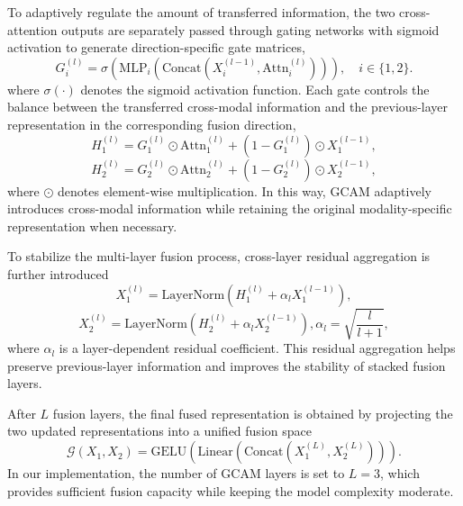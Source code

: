 \documentclass[a4paper,fleqn]{cas-dc}
\begin{document}
To adaptively regulate the amount of transferred information, the two cross-attention outputs are separately passed through gating networks with sigmoid activation to generate direction-specific gate matrices,
\begin{equation}
    G_i^{(l)}=\sigma\left(
\mathrm{MLP}_i\left(
\mathrm{Concat}\left(X_i^{(l-1)}, \mathrm{Attn}_i^{(l)}\right)
\right)
\right), \quad i\in\{1,2\}.
\end{equation}
where $\sigma(\cdot)$ denotes the sigmoid activation function. Each gate controls the balance between the transferred cross-modal information and the previous-layer representation in the corresponding fusion direction,
\begin{equation}
H_1^{(l)}
=
G_1^{(l)} \odot \mathrm{Attn}_1^{(l)}
+
\left(1-G_1^{(l)}\right)\odot X_1^{(l-1)},
\end{equation}
\vspace{-2em}
\begin{equation}
H_2^{(l)}
=
G_2^{(l)} \odot \mathrm{Attn}_2^{(l)}
+
\left(1-G_2^{(l)}\right)\odot X_2^{(l-1)},
\end{equation}
where $\odot$ denotes element-wise multiplication. In this way, GCAM adaptively introduces cross-modal information while retaining the original modality-specific representation when necessary.

To stabilize the multi-layer fusion process, cross-layer residual aggregation is further introduced
\begin{equation}
X_1^{(l)}
=
\mathrm{LayerNorm}
\left(
H_1^{(l)}+\alpha_l X_1^{(l-1)}
\right),
\end{equation}
\vspace{-2em}
\begin{equation}
X_2^{(l)}
=
\mathrm{LayerNorm}
\left(
H_2^{(l)}+\alpha_l X_2^{(l-1)}
\right),
\alpha_l=\sqrt{\frac{l}{l+1}},
\end{equation}
where $\alpha_l$ is a layer-dependent residual coefficient. This residual aggregation helps preserve previous-layer information and improves the stability of stacked fusion layers.

After $L$ fusion layers, the final fused representation is obtained by projecting the two updated representations into a unified fusion space
\begin{equation}
\mathcal{G}(X_1,X_2)
=
\mathrm{GELU}
\left(
\mathrm{Linear}
\left(
\mathrm{Concat}
\left(
X_1^{(L)},X_2^{(L)}
\right)
\right)
\right).
\end{equation}
In our implementation, the number of GCAM layers is set to $L=3$, which provides sufficient fusion capacity while keeping the model complexity moderate.
\end{document}
